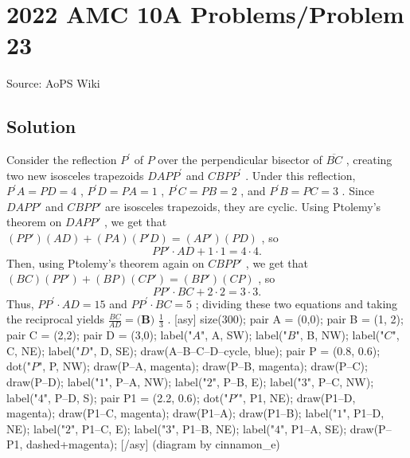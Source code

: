 \documentclass[12pt]{article}
\begin{document}
\section*{{2022 AMC 10A Problems/Problem 23}}
Source: AoPS Wiki

\subsection*{Solution}
Consider the reflection $P^{\prime}$ of $P$ over the perpendicular bisector of $\overline{BC}$ , creating two new isosceles trapezoids $DAPP^{\prime}$ and $CBPP^{\prime}$ . Under this reflection, $P^{\prime}A=PD=4$ , $P^{\prime}D=PA=1$ , $P^{\prime}C=PB=2$ , and $P^{\prime}B=PC=3$ . Since $DAPP'$ and $CBPP'$ are isosceles trapezoids, they are cyclic. Using Ptolemy's theorem on $DAPP'$ , we get that $(PP')(AD) + (PA)(P'D) = (AP')(PD)$ , so \[PP' \cdot AD + 1 \cdot 1 = 4 \cdot 4.\] Then, using Ptolemy's theorem again on $CBPP'$ , we get that $(BC)(PP') + (BP)(CP') = (BP')(CP)$ , so \[PP' \cdot BC + 2 \cdot 2 = 3 \cdot 3.\] Thus, $PP^{\prime}\cdot AD=15$ and $PP^{\prime}\cdot BC=5$ ; dividing these two equations and taking the reciprocal yields $\frac{BC}{AD}=\boxed{\textbf{(B) }\frac{1}{3}}$ . [asy] size(300); pair A = (0,0); pair B = (1, 2); pair C = (2,2); pair D = (3,0); label("$A$", A, SW); label("$B$", B, NW); label("$C$", C, NE); label("$D$", D, SE); draw(A--B--C--D--cycle, blue); pair P = (0.8, 0.6); dot("$P$", P, NW); draw(P--A, magenta); draw(P--B, magenta); draw(P--C); draw(P--D); label("$1$", P--A, NW); label("$2$", P--B, E); label("$3$", P--C, NW); label("$4$", P--D, S); pair P1 = (2.2, 0.6); dot("$P'$", P1, NE); draw(P1--D, magenta); draw(P1--C, magenta); draw(P1--A); draw(P1--B); label("$1$", P1--D, NE); label("$2$", P1--C, E); label("$3$", P1--B, NE); label("$4$", P1--A, SE); draw(P--P1, dashed+magenta); [/asy] (diagram by cinnamon_e)
\end{document}
